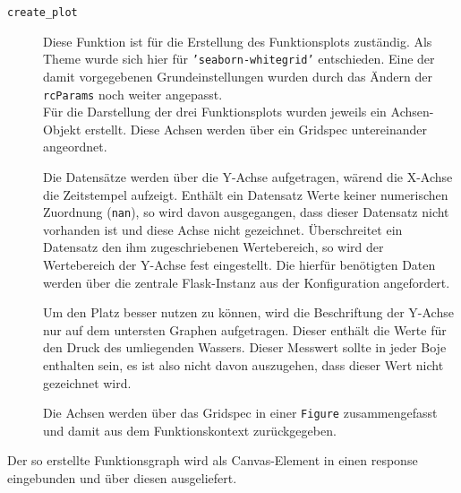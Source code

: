 \begin{description}
 \item [\texttt{create\_plot}]
    Diese Funktion ist für die Erstellung des Funktionsplots zuständig. Als Theme wurde sich hier für \texttt{'seaborn-whitegrid'} entschieden. Eine der damit vorgegebenen Grundeinstellungen wurden durch das Ändern der \texttt{rcParams} noch weiter angepasst.\\
    Für die Darstellung der drei Funktionsplots wurden jeweils ein Achsen-Objekt erstellt. Diese Achsen werden über ein Gridspec untereinander angeordnet.

    Die Datensätze werden über die Y-Achse aufgetragen, wärend die X-Achse die Zeitstempel aufzeigt. Enthält ein Datensatz Werte keiner numerischen Zuordnung (\texttt{nan}), so wird davon ausgegangen, dass dieser Datensatz nicht vorhanden ist und diese Achse nicht gezeichnet. Überschreitet ein Datensatz den ihm zugeschriebenen Wertebereich, so wird der Wertebereich der Y-Achse fest eingestellt. Die hierfür benötigten Daten werden über die zentrale Flask-Instanz aus der Konfiguration angefordert.

    Um den Platz besser nutzen zu können, wird die Beschriftung der Y-Achse nur auf dem untersten Graphen aufgetragen. Dieser enthält die Werte für den Druck des umliegenden Wassers. Dieser Messwert sollte in jeder Boje enthalten sein, es ist also nicht davon auszugehen, dass dieser Wert nicht gezeichnet wird.

    Die Achsen werden über das Gridspec in einer \texttt{Figure} zusammengefasst und damit aus dem Funktionskontext zurückgegeben.
\end{description}

Der so erstellte Funktionsgraph wird als Canvas-Element in einen response eingebunden und über diesen ausgeliefert.







